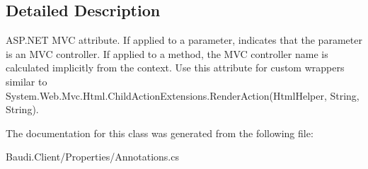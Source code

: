 \subsection{Detailed Description}
A\+S\+P.\+N\+E\+T M\+V\+C attribute. If applied to a parameter, indicates that the parameter is an M\+V\+C controller. If applied to a method, the M\+V\+C controller name is calculated implicitly from the context. Use this attribute for custom wrappers similar to {\ttfamily System.\+Web.\+Mvc.\+Html.\+Child\+Action\+Extensions.\+Render\+Action(\+Html\+Helper, String, String)}. 



The documentation for this class was generated from the following file\+:\begin{DoxyCompactItemize}
\item 
Baudi.\+Client/\+Properties/Annotations.\+cs\end{DoxyCompactItemize}
